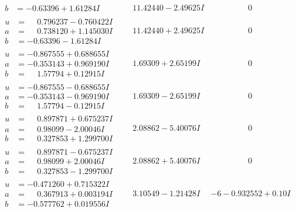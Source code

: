 \documentclass[1p]{elsarticle_modified}
\theoremstyle{definition}
\begin{document}
$$\begin{array}{c|c|c}
\begin{aligned}
b &= -0.63396 + 1.61284 I\end{aligned}
 & \phantom{-}11.42440 - 2.49625 I & \phantom{-0.000000 } 0 \\ \hline\begin{aligned}
u &= \phantom{-}0.796237 - 0.760422 I \\
a &= \phantom{-}0.738120 + 1.145030 I \\
b &= -0.63396 - 1.61284 I\end{aligned}
 & \phantom{-}11.42440 + 2.49625 I & \phantom{-0.000000 } 0 \\ \hline\begin{aligned}
u &= -0.867555 + 0.688655 I \\
a &= -0.353143 + 0.969190 I \\
b &= \phantom{-}1.57794 + 0.12915 I\end{aligned}
 & \phantom{-}1.69309 + 2.65199 I & \phantom{-0.000000 } 0 \\ \hline\begin{aligned}
u &= -0.867555 - 0.688655 I \\
a &= -0.353143 - 0.969190 I \\
b &= \phantom{-}1.57794 - 0.12915 I\end{aligned}
 & \phantom{-}1.69309 - 2.65199 I & \phantom{-0.000000 } 0 \\ \hline\begin{aligned}
u &= \phantom{-}0.897871 + 0.675237 I \\
a &= \phantom{-}0.98099 - 2.00046 I \\
b &= \phantom{-}0.327853 + 1.299700 I\end{aligned}
 & \phantom{-}2.08862 - 5.40076 I & \phantom{-0.000000 } 0 \\ \hline\begin{aligned}
u &= \phantom{-}0.897871 - 0.675237 I \\
a &= \phantom{-}0.98099 + 2.00046 I \\
b &= \phantom{-}0.327853 - 1.299700 I\end{aligned}
 & \phantom{-}2.08862 + 5.40076 I & \phantom{-0.000000 } 0 \\ \hline\begin{aligned}
u &= -0.471260 + 0.715322 I \\
a &= \phantom{-}0.367913 + 0.003194 I \\
b &= -0.577762 + 0.019556 I\end{aligned}
 & \phantom{-}3.10549 - 1.21428 I &                  -6
-0.932552 + 0. 10   I\phantom{ +0.000000I} \\ \hline\begin{aligned}

\end{aligned}
\end{array}$$
\end{document}

